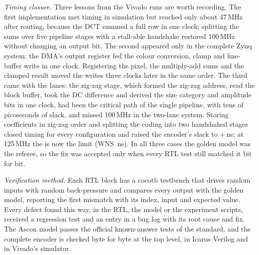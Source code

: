 \documentclass{ieeeaccess}
\begin{document}
\textit{Timing closure.} Three lessons from the Vivado runs are worth recording. The first implementation met timing in simulation but reached only about 47\,MHz after routing, because the DCT summed a full row in one clock; splitting the sums over five pipeline stages with a stall-able handshake restored 100\,MHz without changing an output bit. The second appeared only in the complete Zynq system: the DMA's output register fed the colour conversion, clamp and line-buffer write in one clock. Registering the pixel, the multiply-add sums and the clamped result moved the writes three clocks later in the same order. The third came with the lanes: the zig-zag stage, which formed the zig-zag address, read the block buffer, took the DC difference and derived the size category and amplitude bits in one clock, had been the critical path of the single pipeline, with tens of picoseconds of slack, and missed 100\,MHz in the two-lane system. Storing coefficients in zig-zag order and splitting the coding into two handshaked stages closed timing for every configuration and raised the encoder's slack to $+$\TopWns\,ns; at 125\,MHz the \TopLimitAtOneTwoFive{} is now the limit (WNS \TopWnsAtOneTwoFive\,ns). In all three cases the golden model was the referee, so the fix was accepted only when every RTL test still matched it bit for bit.

\textit{Verification method.} Each RTL block has a cocotb testbench that drives random inputs with random back-pressure and compares every output with the golden model, reporting the first mismatch with its index, input and expected value. Every defect found this way, in the RTL, the model or the experiment scripts, received a regression test and an entry in a bug log with its root cause and fix. The Ascon model passes the official known-answer tests of the standard, and the complete encoder is checked byte for byte at the top level, in Icarus Verilog and in Vivado's simulator.
\fi



\end{document}
